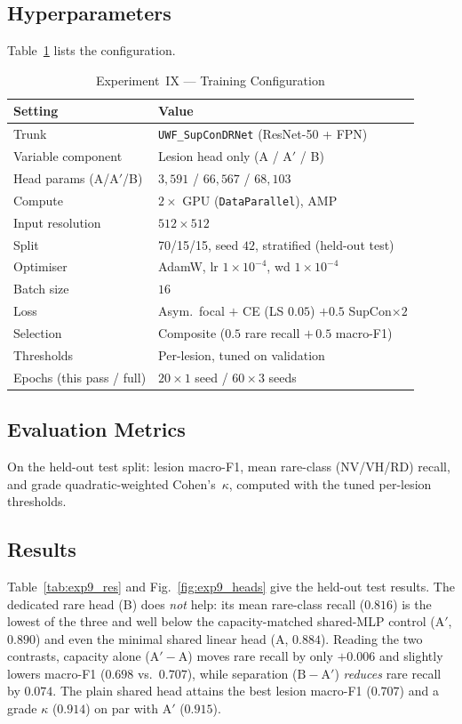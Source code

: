 \documentclass[journal,twoside,web]{ieeecolor}
\begin{document}
\subsection{Hyperparameters}
Table~\ref{tab:exp9_hyper} lists the configuration.

\begin{table}[!t]
\caption{Experiment~IX --- Training Configuration}
\label{tab:exp9_hyper}
\centering
\setlength{\tabcolsep}{5pt}
\begin{tabular}{|l|l|}
\hline
\textbf{Setting} & \textbf{Value} \\
\hline
Trunk & \texttt{UWF\_SupConDRNet} (ResNet-50 + FPN) \\
Variable component & Lesion head only (A / A$'$ / B) \\
Head params (A/A$'$/B) & $3{,}591$ / $66{,}567$ / $68{,}103$ \\
Compute & $2\times$ GPU (\texttt{DataParallel}), AMP \\
Input resolution & $512\times512$ \\
Split & 70/15/15, seed $42$, stratified (held-out test) \\
Optimiser & AdamW, lr $1\times10^{-4}$, wd $1\times10^{-4}$ \\
Batch size & $16$ \\
Loss & Asym.\ focal $+$ CE (LS $0.05$) $+ 0.5$ SupCon$\times2$ \\
Selection & Composite ($0.5$ rare recall $+\,0.5$ macro-F1) \\
Thresholds & Per-lesion, tuned on validation \\
Epochs (this pass / full) & $20\times1$ seed / $60\times3$ seeds \\
\hline
\end{tabular}
\end{table}

\subsection{Evaluation Metrics}
On the held-out test split: lesion macro-F1, mean rare-class (NV/VH/RD) recall, and
grade quadratic-weighted Cohen's~$\kappa$, computed with the tuned per-lesion
thresholds.

\subsection{Results}
Table~\ref{tab:exp9_res} and Fig.~\ref{fig:exp9_heads} give the held-out test
results. The dedicated rare head (B) does \emph{not} help: its mean rare-class
recall ($0.816$) is the lowest of the three and well below the capacity-matched
shared-MLP control (A$'$, $0.890$) and even the minimal shared linear head
(A, $0.884$). Reading the two contrasts, capacity alone ($\text{A}'-\text{A}$) moves
rare recall by only $+0.006$ and slightly lowers macro-F1 ($0.698$ vs.\ $0.707$),
while separation ($\text{B}-\text{A}'$) \emph{reduces} rare recall by $0.074$. The
plain shared head attains the best lesion macro-F1 ($0.707$) and a grade $\kappa$
($0.914$) on par with A$'$ ($0.915$).
\end{document}
